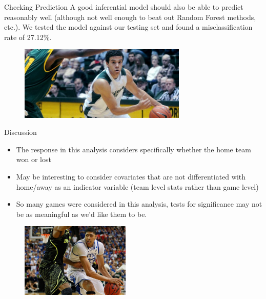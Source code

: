 \documentclass{beamer}
\begin{document}
\begin{frame}{Checking Prediction}
A good inferential model should also be able to predict reasonably well (although not well enough to beat out Random Forest methods, etc.). We tested the model against our testing set and found a misclassification rate of 27.12\%. 
\begin{figure}
	\centering
	\includegraphics[height = 100pt]{dorian.jpg}
	\end{figure}
\end{frame}

\begin{frame}{Discussion}
\begin{itemize}
\item The response in this analysis considers specifically whether the home team won or lost
\item May be interesting to consider covariates that are not differentiated with home/away as an indicator variable (team level stats rather than game level)
\item So many games were considered in this analysis, tests for significance may not be as meaningful as we'd like them to be. 
\end{itemize}
\begin{figure}
	\centering
	\includegraphics[height = 100pt]{unibrow.jpg}
\end{figure}
\end{frame}
\end{document}
